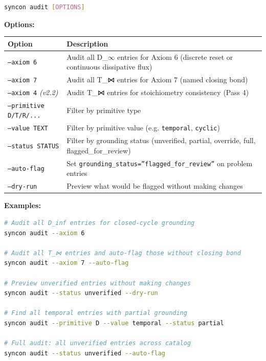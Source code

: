 \documentclass[12pt,a4paper]{article}
\begin{document}
\begin{lstlisting}[language=bash]
syncon audit [OPTIONS]
\end{lstlisting}

\textbf{Options:}

\begin{table}[htbp]
\centering
\small
{}
\begin{tabularx}{\textwidth}{>{\centering\arraybackslash}X >{\centering\arraybackslash}X}
\toprule
\rowcolor{gray!25}\textbf{Option} & \textbf{Description} \\
\midrule
\rowcolors{1}{white}{gray!10}
\texttt{--axiom 6} & Audit all D\_$\infty$ entries for Axiom 6 (discrete reset or continuous dissipative flux) \\
\texttt{--axiom 7} & Audit all T\_⋈ entries for Axiom 7 (named closing bond) \\
\texttt{--axiom 4} \emph{(v2.2)} & Audit T\_⋈ entries for stoichiometry consistency (Pass 4) \\
\texttt{--primitive D/T/R/...} & Filter by primitive type \\
\texttt{--value TEXT} & Filter by primitive value (e.g. \texttt{temporal}, \texttt{cyclic}) \\
\texttt{--status STATUS} & Filter by grounding status (unverified, partial, override, full, flagged\_for\_review) \\
\texttt{--auto-flag} & Set \texttt{grounding\_status=''flagged\_for\_review''} on problem entries \\
\texttt{--dry-run} & Preview what would be flagged without making changes \\
\bottomrule
\end{tabularx}
\end{table}

\textbf{Examples:}

\begin{lstlisting}[language=bash]
# Audit all D_inf entries for closed-cycle grounding
syncon audit --axiom 6

# Audit all T_⋈ entries and auto-flag those without closing bond
syncon audit --axiom 7 --auto-flag

# Preview unverified entries without making changes
syncon audit --status unverified --dry-run

# Find all temporal entries with partial grounding
syncon audit --primitive D --value temporal --status partial

# Full audit: all unverified entries across catalog
syncon audit --status unverified --auto-flag
\end{lstlisting}
\end{document}
